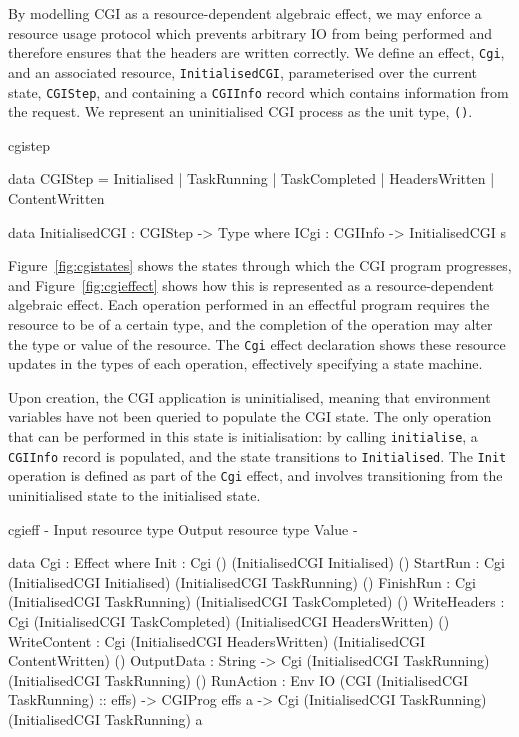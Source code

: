 By modelling CGI as a resource-dependent algebraic effect, we may enforce a
resource usage protocol which
prevents arbitrary IO from being performed and therefore
ensures that the headers are written correctly. We
define an effect, \texttt{Cgi}, and an associated resource,
\texttt{InitialisedCGI}, parameterised over the current state,
\texttt{CGIStep}, and containing a
\texttt{CGIInfo} record which contains information from the request. We
represent an uninitialised CGI process as the unit type, \texttt{()}.

\begin{SaveVerbatim}{cgistep}

data CGIStep = Initialised   | TaskRunning 
             | TaskCompleted | HeadersWritten 
             | ContentWritten

data InitialisedCGI : CGIStep -> Type where
     ICgi : CGIInfo -> InitialisedCGI s

\end{SaveVerbatim}

\noindent
Figure~\ref{fig:cgistates} shows the states through which the CGI program
progresses, and Figure~\ref{fig:cgieffect} shows how this is represented
as a resource-dependent algebraic effect. Each operation performed in an effectful
program requires the resource to be of a certain type, and the completion of
the operation may alter the type or value of the resource. The \texttt{Cgi}
effect declaration shows these resource updates in the types of each operation,
effectively specifying a state machine.

Upon creation, the CGI application is uninitialised, meaning that environment variables have not been queried to populate the CGI state. The only operation
that can be performed in this state is initialisation: by calling
\texttt{initialise}, a \texttt{CGIInfo} record is populated, and the state transitions
to \texttt{Initialised}. The \texttt{Init} operation is defined as part of the
\texttt{Cgi} effect, and involves transitioning from the uninitialised state to
the initialised state.

\begin{SaveVerbatim}{cgieff}
{-                     { Input resource type }         { Output resource type }        { Value } -}

data Cgi : Effect where
    Init         : Cgi ()                              (InitialisedCGI Initialised)    ()
    StartRun     : Cgi (InitialisedCGI Initialised)    (InitialisedCGI TaskRunning)    ()
    FinishRun    : Cgi (InitialisedCGI TaskRunning)    (InitialisedCGI TaskCompleted)  ()
    WriteHeaders : Cgi (InitialisedCGI TaskCompleted)  (InitialisedCGI HeadersWritten) ()
    WriteContent : Cgi (InitialisedCGI HeadersWritten) (InitialisedCGI ContentWritten) ()
    OutputData   : String -> 
                   Cgi (InitialisedCGI TaskRunning)    (InitialisedCGI TaskRunning)    ()
    RunAction    : Env IO (CGI (InitialisedCGI TaskRunning) :: effs) -> CGIProg effs a -> 
                   Cgi (InitialisedCGI TaskRunning)    (InitialisedCGI TaskRunning)    a
\end{SaveVerbatim}

